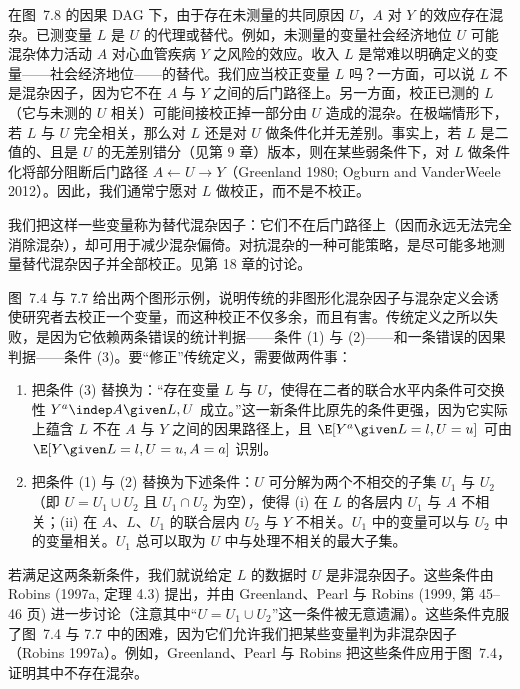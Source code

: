 \begin{finepoint}[替代混杂因子]
在图~7.8 的因果 DAG 下，由于存在未测量的共同原因 $U$，$A$ 对 $Y$ 的效应存在混杂。已测变量 $L$ 是 $U$ 的代理或替代。例如，未测量的变量社会经济地位 $U$ 可能混杂体力活动 $A$ 对心血管疾病 $Y$ 之风险的效应。收入 $L$ 是常难以明确定义的变量——社会经济地位——的替代。我们应当校正变量 $L$ 吗？一方面，可以说 $L$ 不是混杂因子，因为它不在 $A$ 与 $Y$ 之间的后门路径上。另一方面，校正已测的 $L$（它与未测的 $U$ 相关）可能间接校正掉一部分由 $U$ 造成的混杂。在极端情形下，若 $L$ 与 $U$ 完全相关，那么对 $L$ 还是对 $U$ 做条件化并无差别。事实上，若 $L$ 是二值的、且是 $U$ 的无差别错分（见第 9 章）版本，则在某些弱条件下，对 $L$ 做条件化将部分阻断后门路径 $A\leftarrow U\to Y$（Greenland 1980; Ogburn and VanderWeele 2012）。因此，我们通常宁愿对 $L$ 做校正，而不是不校正。

我们把这样一些变量称为替代混杂因子：它们不在后门路径上（因而永远无法完全消除混杂），却可用于减少混杂偏倚。对抗混杂的一种可能策略，是尽可能多地测量替代混杂因子并全部校正。见第 18 章的讨论。
\end{finepoint}

\begin{techpoint}[修正传统的混杂因子定义]
图~7.4 与 7.7 给出两个图形示例，说明传统的非图形化混杂因子与混杂定义会诱使研究者去校正一个变量，而这种校正不仅多余，而且有害。传统定义之所以失败，是因为它依赖两条错误的统计判据——条件 (1) 与 (2)——和一条错误的因果判据——条件 (3)。要“修正”传统定义，需要做两件事：

\begin{enumerate}
\item 把条件 (3) 替换为：“存在变量 $L$ 与 $U$，使得在二者的联合水平内条件可交换性 $Y^{a}\indep A\given L,U$ 成立。”这一新条件比原先的条件更强，因为它实际上蕴含 $L$ 不在 $A$ 与 $Y$ 之间的因果路径上，且 $\E[Y^{a}\given L=l,U=u]$ 可由 $\E[Y\given L=l,U=u,A=a]$ 识别。
\item 把条件 (1) 与 (2) 替换为下述条件：$U$ 可分解为两个不相交的子集 $U_1$ 与 $U_2$（即 $U=U_1\cup U_2$ 且 $U_1\cap U_2$ 为空），使得 (i) 在 $L$ 的各层内 $U_1$ 与 $A$ 不相关；(ii) 在 $A$、$L$、$U_1$ 的联合层内 $U_2$ 与 $Y$ 不相关。$U_1$ 中的变量可以与 $U_2$ 中的变量相关。$U_1$ 总可以取为 $U$ 中与处理不相关的最大子集。
\end{enumerate}

若满足这两条新条件，我们就说给定 $L$ 的数据时 $U$ 是非混杂因子。这些条件由 Robins (1997a, 定理 4.3) 提出，并由 Greenland、Pearl 与 Robins (1999, 第 45–46 页) 进一步讨论（注意其中“$U=U_1\cup U_2$”这一条件被无意遗漏）。这些条件克服了图~7.4 与 7.7 中的困难，因为它们允许我们把某些变量判为非混杂因子（Robins 1997a）。例如，Greenland、Pearl 与 Robins 把这些条件应用于图~7.4，证明其中不存在混杂。
\end{techpoint}
\renewcommand{\TPname}{技术注记}

